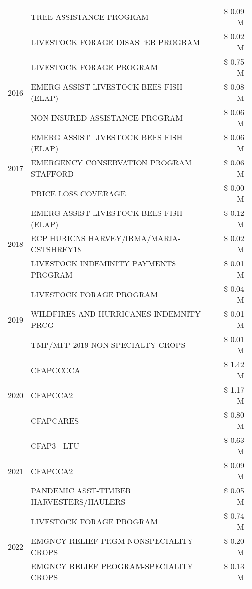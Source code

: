 \begin{tabular}{llr}
 & TREE ASSISTANCE PROGRAM & \$ 0.09 M \\
 & LIVESTOCK FORAGE DISASTER PROGRAM & \$ 0.02 M \\
\cline{1-3}
\multirow[t]{3}{*}{2016} & LIVESTOCK FORAGE PROGRAM & \$ 0.75 M \\
 & EMERG ASSIST LIVESTOCK BEES FISH (ELAP) & \$ 0.08 M \\
 & NON-INSURED ASSISTANCE PROGRAM & \$ 0.06 M \\
\cline{1-3}
\multirow[t]{3}{*}{2017} & EMERG ASSIST LIVESTOCK BEES FISH (ELAP) & \$ 0.06 M \\
 & EMERGENCY CONSERVATION PROGRAM STAFFORD & \$ 0.06 M \\
 & PRICE LOSS COVERAGE & \$ 0.00 M \\
\cline{1-3}
\multirow[t]{3}{*}{2018} & EMERG ASSIST LIVESTOCK BEES FISH (ELAP) & \$ 0.12 M \\
 & ECP HURICNS HARVEY/IRMA/MARIA-CSTSHRFY18 & \$ 0.02 M \\
 & LIVESTOCK INDEMINITY PAYMENTS PROGRAM & \$ 0.01 M \\
\cline{1-3}
\multirow[t]{3}{*}{2019} & LIVESTOCK FORAGE PROGRAM & \$ 0.04 M \\
 & WILDFIRES AND HURRICANES INDEMNITY PROG & \$ 0.01 M \\
 & TMP/MFP 2019 NON SPECIALTY CROPS & \$ 0.01 M \\
\cline{1-3}
\multirow[t]{3}{*}{2020} & CFAPCCCCA & \$ 1.42 M \\
 & CFAPCCA2 & \$ 1.17 M \\
 & CFAPCARES & \$ 0.80 M \\
\cline{1-3}
\multirow[t]{3}{*}{2021} & CFAP3 - LTU & \$ 0.63 M \\
 & CFAPCCA2 & \$ 0.09 M \\
 & PANDEMIC ASST-TIMBER HARVESTERS/HAULERS & \$ 0.05 M \\
\cline{1-3}
\multirow[t]{3}{*}{2022} & LIVESTOCK FORAGE PROGRAM & \$ 0.74 M \\
 & EMGNCY RELIEF PRGM-NONSPECIALITY CROPS & \$ 0.20 M \\
 & EMGNCY RELIEF PROGRAM-SPECIALITY CROPS & \$ 0.13 M \\
\cline{1-3}
\bottomrule
\end{tabular}
